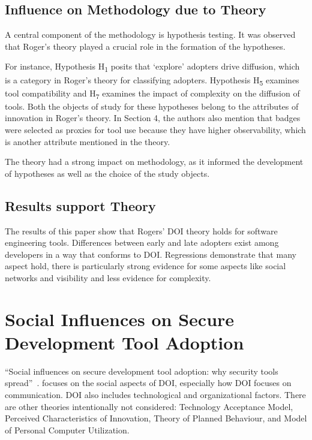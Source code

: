 \documentclass[journal,12pt,onecolumn,]{IEEEtran}
\begin{document}
\subsection{Influence on Methodology due to Theory}

A central component of the methodology is hypothesis testing. It was observed that Roger's theory played a crucial role in the formation of the hypotheses.

For instance, Hypothesis H\textsubscript{1}  posits that `explore' adopters drive diffusion, which is a category in Roger's theory for classifying adopters. Hypothesis
H\textsubscript{5} examines tool compatibility and H\textsubscript{7} examines the impact of complexity on the diffusion of tools. Both the objects of study for these hypotheses belong to the attributes of innovation in Roger's theory.
In Section 4, the authors also mention that badges were selected as proxies for tool use because they have higher observability, which is another attribute mentioned in the theory.

The theory had a strong impact on methodology, as it informed the development of hypotheses as well as the choice of the study objects.

\subsection{Results support Theory}

The results of this paper show that Rogers' DOI theory holds for software engineering tools. Differences between early and late adopters exist among developers in a way that conforms to DOI. Regressions demonstrate that many aspect hold, there is particularly strong evidence for some aspects like social networks and visibility and less evidence for complexity.


\section{Social Influences on Secure Development Tool Adoption}

``Social influences on secure development tool adoption: why security tools spread''~\cite{xiao2014social}. focuses on the social aspects of DOI, especially how DOI focuses on communication.
DOI also includes technological and organizational factors.
There are other theories intentionally not considered: Technology Acceptance Model, Perceived Characteristics of Innovation, Theory of Planned Behaviour, and Model of Personal Computer Utilization.
\end{document}
